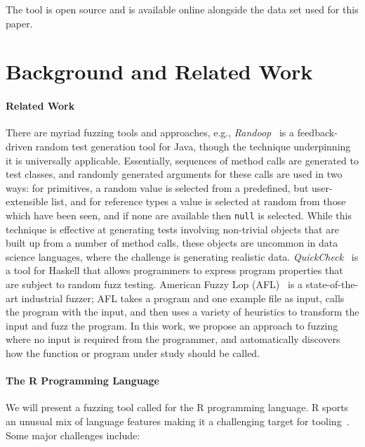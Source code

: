 \documentclass[sigplan,anonymous,review]{acmart}
\begin{document}
The tool is open source and is available online alongside the data set used for this paper.

\section{Background and Related Work}
\label{sec:background}

\paragraph{Related Work}

There are myriad fuzzing tools and approaches, e.g., \emph{Randoop}~\cite{pacheco2007randoop} is a feedback-driven random test generation tool for Java, though the technique underpinning it is universally applicable.
Essentially, sequences of method calls are generated to test classes, and randomly generated arguments for these calls are used in two ways: for primitives, a random value is selected from a predefined, but user-extensible list, and for reference types a value is selected at random from those which have been seen, and if none are available then {\tt null} is selected.
While this technique is effective at generating tests involving non-trivial objects that are built up from a number of method calls, these objects are uncommon in data science languages, where the challenge is generating realistic data.
\emph{QuickCheck}~\cite{quickcheck} is a tool for Haskell that allows programmers to express program properties that are subject to random fuzz testing.
American Fuzzy Lop (AFL)~\cite{afl} is a state-of-the-art industrial fuzzer; AFL takes a program and one example file as input, calls the program with the input, and then uses a variety of heuristics to transform the input and fuzz the program.
 In this work, we propose an approach to fuzzing where no input is required from the programmer, and automatically discovers how the function or program under study should be called.

\paragraph{The R Programming Language}

We will present a fuzzing tool called \tool for the R programming language.
R sports an unusual mix of language features making it a challenging target for
tooling~\cite{morandat2012evaluating}. 
Some major challenges include:
\end{document}
